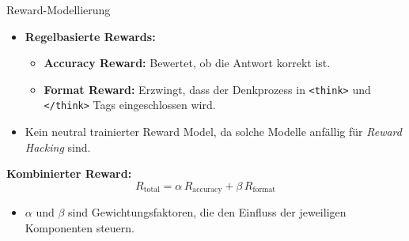 \documentclass[aspectratio=1610, xcolor=dvipsnames, 9pt]{beamer}
\begin{document}
\begin{frame}{Reward-Modellierung}
  \begin{itemize}
      \item \textbf{Regelbasierte Rewards:}
      \begin{itemize}
          \item \textbf{Accuracy Reward:} Bewertet, ob die Antwort korrekt ist.
          \item \textbf{Format Reward:} Erzwingt, dass der Denkprozess in \texttt{<think>} und \texttt{</think>} Tags eingeschlossen wird.
      \end{itemize}
      \item Kein neutral trainierter Reward Model, da solche Modelle anfällig für \emph{Reward Hacking} sind.
  \end{itemize}
  \vspace{0.3cm}
  \textbf{Kombinierter Reward:}\\[0.2cm]
  \[
  R_{\mathrm{total}} = \alpha\, R_{\mathrm{accuracy}} + \beta\, R_{\mathrm{format}}
  \]
  \begin{itemize}
      \item \(\alpha\) und \(\beta\) sind Gewichtungsfaktoren, die den Einfluss der jeweiligen Komponenten steuern.
  \end{itemize}
\end{frame}
\end{document}
